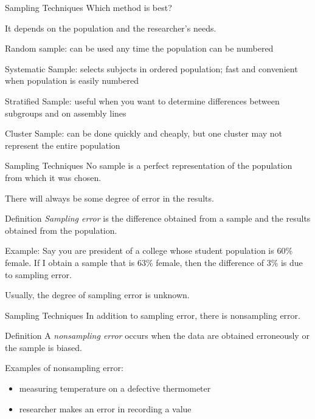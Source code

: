 \documentclass[t]{beamer}
\newcommand{\?}{\stackrel{?}{=}}
\begin{document}
	\begin{frame}{Sampling Techniques}
		Which method is best? \pause
		
		It depends on the population and the researcher's needs.
		
		Random sample: can be used any time the population can be numbered \pause
		
		Systematic Sample: selects subjects in ordered population; fast and convenient when population is easily numbered \pause
		
		Stratified Sample: useful when you want to determine differences between subgroups and on assembly lines \pause
		
		Cluster Sample: can be done quickly and cheaply, but one cluster may not represent the entire population
	\end{frame}

	\begin{frame}{Sampling Techniques}
		No sample is a perfect representation of the population from which it was chosen.
		
		There will always be some degree of error in the results. \pause
		
		\begin{block}{Definition}
			\textit{Sampling error} is the difference obtained from a sample and the results obtained from the population.
		\end{block} \pause
	
		Example: Say you are president of a college whose student population is 60\% female. If I obtain a sample that is 63\% female, then the difference of 3\% is due to sampling error. \pause
		
		Usually, the degree of sampling error is unknown.
	\end{frame}

	\begin{frame}{Sampling Techniques}
		In addition to sampling error, there is nonsampling error.
		
		\begin{block}{Definition}
			A \textit{nonsampling error} occurs when the data are obtained erroneously or the sample is biased.
		\end{block} \pause
	
		Examples of nonsampling error: \begin{itemize}
			\item measuring temperature on a defective thermometer
			\item researcher makes an error in recording a value
		\end{itemize}
	\end{frame}
\end{document}
